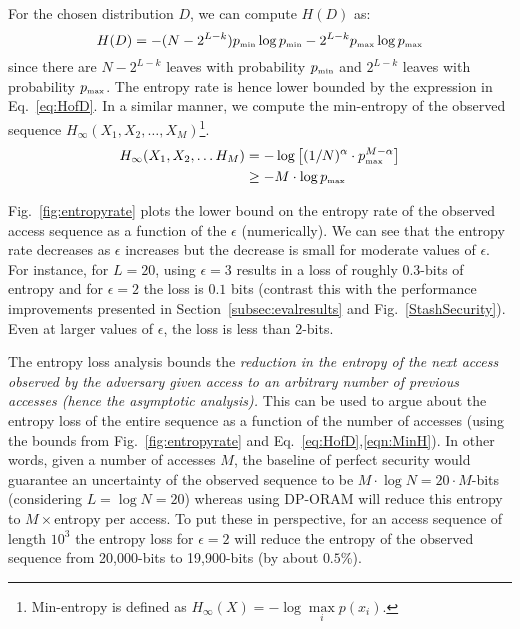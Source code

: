 \documentclass[USenglish,oneside,twocolumn]{article}
\begin{document}
For the chosen distribution $D$, we can compute $H(D)$ as:
\begin{equation}\label{eq:HofD}
H(D) = - (N-2^{L-k}) p_{{\tiny \mbox{min}}} \log p_{{\tiny \mbox{min}}} - 2^{L-k} p_{{\tiny \mbox{max}}} \log p_{{\tiny \mbox{max}}}
\end{equation}
since there are $N-2^{L-k}$ leaves with probability $p_{{\tiny \mbox{min}}}$ and $2^{L-k}$ leaves with probability $p_{{\tiny \mbox{max}}}$. The entropy rate is hence lower bounded by the expression in Eq.~\ref{eq:HofD}. In a similar manner, we compute the min-entropy of the observed sequence $H_{\infty} (X_1, X_2, \hdots , X_M)$\footnote{Min-entropy is defined as $H_{\infty}(X) = - \log \max\limits_{i} p(x_i)$.}.
\begin{align} \label{eqn:MinH}
H_{\infty}(X_1, X_2, \hdots H_M) &= - \log \left[ (1/N)^{\alpha} \cdot p_{{\tiny \mbox{max}}}^{M-\alpha} \right] \nonumber \\
&\geq - M \cdot \log p_{{\tiny \mbox{max}}}
\end{align}






Fig.~\ref{fig:entropyrate} plots the lower bound on the entropy rate of the observed access sequence as a function of the $\epsilon$ (numerically). We can see that the entropy rate decreases as $\epsilon$ increases but the decrease is small for moderate values of $\epsilon$. For instance, for $L=20$, using $\epsilon = 3$ results in a loss of roughly $0.3$-bits of entropy and for $\epsilon = 2$ the loss is $0.1$ bits (contrast this with the performance improvements presented in Section~\ref{subsec:evalresults} and Fig.~\ref{StashSecurity}). Even at larger values of $\epsilon$, the loss is less than $2$-bits.

The entropy loss analysis bounds the \textit{reduction in the entropy of the next access observed by the adversary given access to an arbitrary number of previous accesses (hence the asymptotic analysis).} This can be used to argue about the entropy loss of the entire sequence as a function of the number of accesses (using the bounds from Fig.~\ref{fig:entropyrate} and Eq.~\ref{eq:HofD},\ref{eqn:MinH}). In other words, given a number of accesses $M$, the baseline of perfect security would guarantee an uncertainty of the observed sequence to be $M \cdot \log N = 20 \cdot M$-bits (considering $L = \log N = 20$) whereas using DP-ORAM will reduce this entropy to $M \times$entropy per access. To put these in perspective, for an access sequence of length $10^3$ the entropy loss for $\epsilon = 2$ will reduce the entropy of the observed sequence from 20,000-bits to 19,900-bits (by about $0.5$\%).
\end{document}
